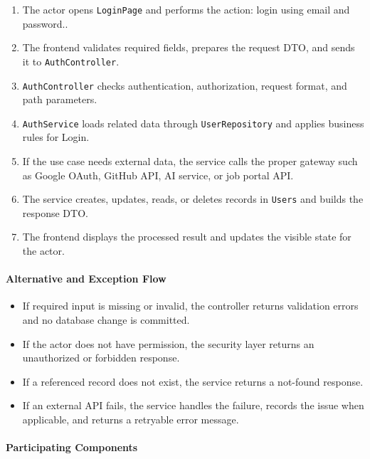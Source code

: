 \begin{enumerate}
    \item The actor opens \texttt{LoginPage} and performs the action: login using email and password..
    \item The frontend validates required fields, prepares the request DTO, and sends it to \texttt{AuthController}.
    \item \texttt{AuthController} checks authentication, authorization, request format, and path parameters.
    \item \texttt{AuthService} loads related data through \texttt{UserRepository} and applies business rules for Login.
    \item If the use case needs external data, the service calls the proper gateway such as Google OAuth, GitHub API, AI service, or job portal API.
    \item The service creates, updates, reads, or deletes records in \texttt{Users} and builds the response DTO.
    \item The frontend displays the processed result and updates the visible state for the actor.
\end{enumerate}

\paragraph{Alternative and Exception Flow}

\begin{itemize}
    \item If required input is missing or invalid, the controller returns validation errors and no database change is committed.
    \item If the actor does not have permission, the security layer returns an unauthorized or forbidden response.
    \item If a referenced record does not exist, the service returns a not-found response.
    \item If an external API fails, the service handles the failure, records the issue when applicable, and returns a retryable error message.
\end{itemize}

\paragraph{Participating Components}

